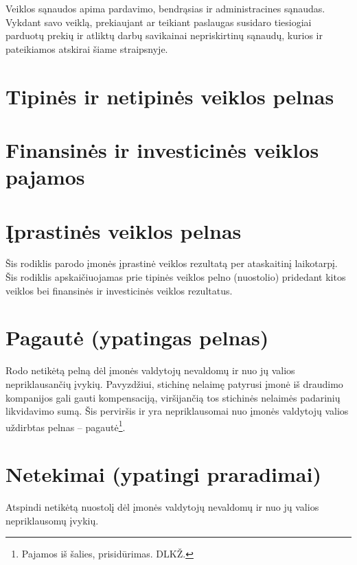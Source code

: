 
Veiklos sąnaudos apima pardavimo, bendrąsias ir administracines sąnaudas.
Vykdant savo veiklą, prekiaujant ar teikiant paslaugas susidaro tiesiogiai
parduotų prekių ir atliktų darbų savikainai nepriskirtinų sąnaudų, kurios
ir pateikiamos atskirai šiame straipsnyje.

\section{Tipinės ir netipinės veiklos pelnas}


\section{Finansinės ir investicinės veiklos pajamos}


\section{Įprastinės veiklos pelnas}


Šis rodiklis parodo įmonės įprastinė veiklos rezultatą per ataskaitinį
laikotarpį. Šis rodiklis apskaičiuojamas prie tipinės veiklos pelno
(nuostolio) pridedant kitos veiklos bei finansinės ir investicinės
veiklos rezultatus.

\section{Pagautė (ypatingas pelnas)}


Rodo netikėtą pelną dėl įmonės valdytojų nevaldomų ir nuo jų valios
nepriklausančių įvykių. Pavyzdžiui, stichinę nelaimę patyrusi įmonė
iš draudimo kompanijos gali gauti kompensaciją, viršijančią tos stichinės
nelaimės padarinių likvidavimo sumą. Šis perviršis ir yra nepriklausomai
nuo įmonės valdytojų valios uždirbtas pelnas – pagautė\footnote{
Pajamos iš šalies, prisidūrimas. DLKŽ.}.

\section{Netekimai (ypatingi praradimai)}


Atspindi netikėtą nuostolį dėl įmonės valdytojų nevaldomų ir nuo jų
valios nepriklausomų įvykių.

